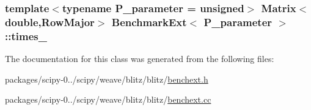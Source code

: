 \subsubsection[{times\+\_\+}]{\setlength{\rightskip}{0pt plus 5cm}template$<$typename P\+\_\+parameter  = unsigned$>$ {\bf Matrix}$<$double,{\bf Row\+Major}$>$ {\bf Benchmark\+Ext}$<$ P\+\_\+parameter $>$\+::times\+\_\+\hspace{0.3cm}{\ttfamily [protected]}}\label{classBenchmarkExt_ae5e33ddbac604a0ada9c6e95f2d6341d}


The documentation for this class was generated from the following files\+:\begin{DoxyCompactItemize}
\item 
packages/scipy-\/0../scipy/weave/blitz/blitz/\hyperlink{benchext_8h}{benchext.\+h}\item 
packages/scipy-\/0../scipy/weave/blitz/blitz/\hyperlink{benchext_8cc}{benchext.\+cc}\end{DoxyCompactItemize}
